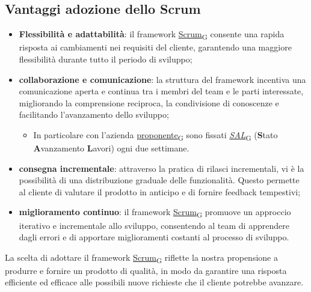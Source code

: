 \subsection{Vantaggi adozione dello Scrum}
\begin{itemize}
    \item \textbf{Flessibilità e adattabilità}: il framework \href{https://7last.github.io/docs/rtb/documentazione-interna/glossario\#scrum}{Scrum\textsubscript{G}} consente una rapida risposta ai cambiamenti nei requisiti del cliente, garantendo una maggiore flessibilità durante tutto il periodo di sviluppo;
    \item \textbf{collaborazione e comunicazione}: la struttura del framework incentiva una comunicazione aperta e continua tra i membri del team e le parti interessate, migliorando la comprensione reciproca, la condivisione di conoscenze e facilitando l'avanzamento dello sviluppo;
    \begin{itemize}
        \item In particolare con l’azienda \href{https://7last.github.io/docs/rtb/documentazione-interna/glossario\#proponente}{proponente\textsubscript{G}} sono fissati \href{https://7last.github.io/docs/rtb/documentazione-interna/glossario\#sal}{\textit{SAL}\textsubscript{G}} (\textbf{S}tato \textbf{A}vanzamento \textbf{L}avori) ogni due settimane.
    \end{itemize}
    \item \textbf{consegna incrementale}: attraverso la pratica di rilasci incrementali, vi è la possibilità di una distribuzione graduale delle funzionalità. Questo permette al cliente di valutare il prodotto in anticipo e di fornire feedback tempestivi;
    \item \textbf{miglioramento continuo}: il framework \href{https://7last.github.io/docs/rtb/documentazione-interna/glossario\#scrum}{Scrum\textsubscript{G}} promuove un approccio iterativo e incrementale allo sviluppo, consentendo al team di apprendere dagli errori e di apportare miglioramenti costanti al processo di sviluppo.
\end{itemize}
La scelta di adottare il framework \href{https://7last.github.io/docs/rtb/documentazione-interna/glossario\#scrum}{Scrum\textsubscript{G}} riflette la nostra propensione a produrre e fornire un prodotto di qualità, in modo da garantire una risposta efficiente ed efficace alle possibili nuove richieste che il cliente potrebbe avanzare.

